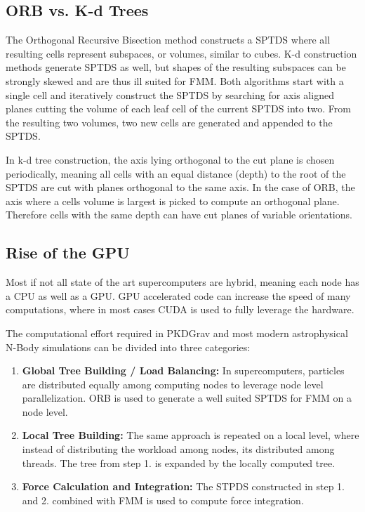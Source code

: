 \documentclass[]{article}
\begin{document}
\subsection{ORB vs. K-d Trees}

The Orthogonal Recursive Bisection method constructs a SPTDS where all resulting cells represent subspaces, or volumes, similar to cubes. K-d construction methods generate SPTDS as well, but shapes of the resulting subspaces can be strongly skewed and are thus ill suited for FMM. Both algorithms start with a single cell and iteratively construct the SPTDS by searching for axis aligned planes cutting the volume of each leaf cell of the current SPTDS into two. From the resulting two volumes, two new cells are generated and appended to the SPTDS. 

In k-d tree construction, the axis lying orthogonal to the cut plane is chosen periodically, meaning all cells with an equal distance (depth) to the root of the SPTDS are cut with planes orthogonal to the same axis. In the case of ORB, the axis where a cells volume is largest is picked to compute an orthogonal plane. Therefore cells with the same depth can have cut planes of variable orientations. 

\subsection{Rise of the GPU}

Most if not all state of the art supercomputers are hybrid, meaning each node has a CPU as well as a GPU.\cite{TOP500} GPU accelerated code can increase the speed of many computations, where in most cases CUDA is used to fully leverage the hardware. 

The computational effort required in PKDGrav and most modern astrophysical N-Body simulations can be divided into three categories:

\begin{enumerate}
	\item \textbf{Global Tree Building / Load Balancing:} In supercomputers, particles are distributed equally among computing nodes to leverage node level parallelization. ORB is used to generate a well suited SPTDS for FMM on a node level.
	\item \textbf{Local Tree Building:} The same approach is repeated on a local level, where instead of distributing the workload among nodes, its distributed among threads. The tree from step 1. is expanded by the locally computed tree.
	\item \textbf{Force Calculation and Integration:} The STPDS constructed in step 1. and 2. combined with FMM is used to compute force integration. 
\end{enumerate}
\end{document}
